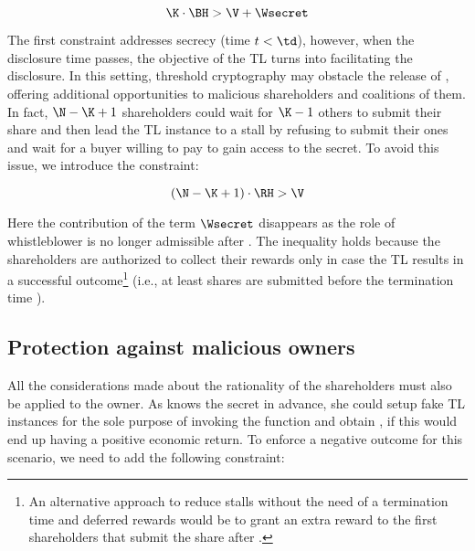 \begin{equation}\label{eqcoscom2}
\K \cdot \BH > \V + \Wsecret
\end{equation}


The first constraint addresses secrecy (time $t < \td$), however, when the disclosure time passes, the objective of the TL turns into facilitating the disclosure.
In this setting, threshold cryptography may obstacle the release of \secret, offering additional opportunities to malicious shareholders and coalitions of them.
In fact, $\N - \K + 1$ shareholders could wait for $\K - 1$ others to submit their share and then lead the TL instance to a stall by refusing to submit their ones and wait for a buyer willing to pay \V to gain access to the secret.
To avoid this issue, we introduce the constraint:  

\begin{equation}\label{eqcoscom4}
(\N - \K + 1) \cdot \RH  > \V
\end{equation}

Here the contribution of the term $\Wsecret$ disappears as the role of whistleblower is no longer admissible after \td. The inequality holds because the shareholders are authorized to collect their rewards \RH only in case the TL results in a successful outcome\footnote{An alternative approach to reduce stalls without the need of a termination time and deferred rewards would be to grant an extra reward \extrareward to the first \K shareholders that submit the share after \td.
}
(i.e., at least \K shares are submitted before the termination time \te).


\subsection{Protection against malicious owners}\label{sect:mal_own}

All the considerations made about the rationality of the shareholders must also be applied to the owner.
As \owner knows the secret in advance, she could setup fake TL instances for the sole purpose of invoking the \texttt{\algowhistleblowsecret} function and obtain \Wsecret, if this would end up having a positive economic return.
%
To enforce a negative outcome for this scenario, we need to add the following constraint:

